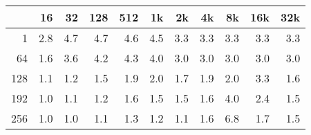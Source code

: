 \begin{tabular}{r | r r r r r r r r r r}
 	 &16	 &32	 &128	 &512	 &1k	 &2k	 &4k	 &8k	 &16k	 &32k	\\ \hline
1	& 2.8	& 4.7	& 4.7	& 4.6	& 4.5	& 3.3	& 3.3	& 3.3	& 3.3	& 3.3	\\
64	& 1.6	& 3.6	& 4.2	& 4.3	& 4.0	& 3.0	& 3.0	& 3.0	& 3.0	& 3.0	\\
128	& 1.1	& 1.2	& 1.5	& 1.9	& 2.0	& 1.7	& 1.9	& 2.0	& 3.3	& 1.6	\\
192	& 1.0	& 1.1	& 1.2	& 1.6	& 1.5	& 1.5	& 1.6	& 4.0	& 2.4	& 1.5	\\
256	& 1.0	& 1.0	& 1.1	& 1.3	& 1.2	& 1.1	& 1.6	& 6.8	& 1.7	& 1.5	\\
\end{tabular}
